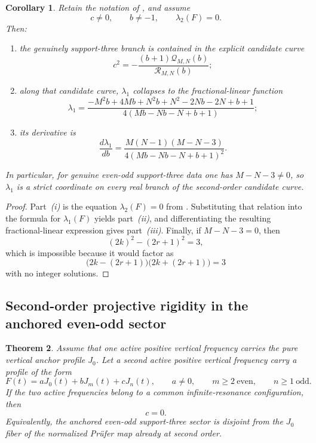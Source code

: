 \documentclass[11pt,reqno]{amsart}
\newtheorem{theorem}{Theorem}[section]
\newtheorem{corollary}[theorem]{Corollary}
\theoremstyle{definition}
\begin{document}
\begin{corollary}\label{cor:anchor-evenodd-mobius}
Retain the notation of , and assume
\[
c\neq 0,
\qquad
b\neq -1,
\qquad
\lambda_2(F)=0.
\]
Then:
\begin{enumerate}[label=\emph{(\roman*)}]
\item the genuinely support-three branch is contained in the explicit candidate curve
\[
c^2=-\frac{(b+1)\mathcal Q_{M,N}(b)}{\mathcal R_{M,N}(b)};
\]
\item along that candidate curve, $\lambda_1$ collapses to the fractional-linear function
\[
\lambda_1
=
\frac{-M^2b+4Mb+N^2b+N^2-2Nb-2N+b+1}
{4(Mb-Nb-N+b+1)};
\]
\item its derivative is
\[
\frac{d\lambda_1}{db}
=
\frac{M(N-1)(M-N-3)}
{4(Mb-Nb-N+b+1)^2}.
\]
\end{enumerate}
In particular, for genuine even-odd support-three data one has $M-N-3\neq 0$, so $\lambda_1$
is a strict coordinate on every real branch of the second-order candidate curve.
\end{corollary}

\begin{proof}
Part~\emph{(i)} is the equation $\lambda_2(F)=0$ from
. Substituting that relation into the formula for
$\lambda_1(F)$ yields part~\emph{(ii)}, and differentiating the resulting fractional-linear
expression gives part~\emph{(iii)}. Finally, if $M-N-3=0$, then
\[
(2k)^2-(2r+1)^2=3,
\]
which is impossible because it would factor as
\[
\bigl(2k-(2r+1)\bigr)\bigl(2k+(2r+1)\bigr)=3
\]
with no integer solutions.
\end{proof}

\subsection*{Second-order projective rigidity in the anchored even-odd sector}

\begin{theorem}\label{thm:anchor-evenodd-second-order-rigidity}
Assume that one active positive vertical frequency carries the pure vertical anchor profile
$J_0$. Let a second active positive vertical frequency carry a profile of the form
\[
F(t)=aJ_0(t)+bJ_m(t)+cJ_n(t),
\qquad
a\neq 0,
\qquad
m\ge 2\ \text{even},
\qquad
n\ge 1\ \text{odd}.
\]
If the two active frequencies belong to a common infinite-resonance configuration, then
\[
c=0.
\]
Equivalently, the anchored even-odd support-three sector is disjoint from the $J_0$ fiber of
the normalized Pr\"ufer map already at second order.
\end{theorem}
\end{document}
